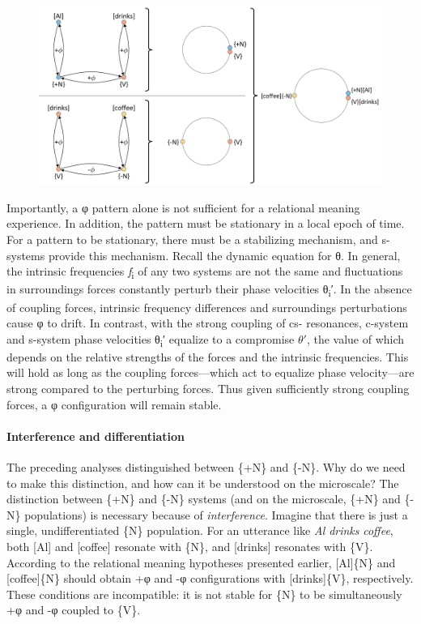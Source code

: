   
\begin{figure}
\includegraphics[width=\textwidth]{figures/Tilsen-img22.png}
\caption{\missingcaption}
\label{fig:}
\end{figure}
 

  Importantly, a φ pattern alone is not sufficient for a relational meaning experience. In addition, the pattern must be stationary in a local epoch of time. For a pattern to be stationary, there must be a stabilizing mechanism, and s-systems provide this mechanism. Recall the dynamic equation for θ. In general, the intrinsic frequencies \textit{f}\textsubscript{i} of any two systems are not the same and fluctuations in surroundings forces constantly perturb their phase velocities θ\textsubscript{i}′. In the absence of coupling forces, intrinsic frequency differences and surroundings perturbations cause φ to drift. In contrast, with the strong coupling of cs- resonances, c-system and s-system phase velocities θ\textsubscript{i}′ equalize to a compromise $\theta ′$, the value of which depends on the relative strengths of the forces and the intrinsic frequencies. This will hold as long as the coupling forces—which act to equalize phase velocity—are strong compared to the perturbing forces. Thus given sufficiently strong coupling forces, a φ configuration will remain stable.

\paragraph{Interference and differentiation}

The preceding analyses distinguished between \{+N\} and \{-N\}. Why do we need to make this distinction, and how can it be understood on the microscale? The distinction between \{+N\} and \{-N\} systems (and on the microscale, \{+N\} and \{-N\} populations) is necessary because of \textit{interference}. Imagine that there is just a single, undifferentiated \{N\} population. For an utterance like \textit{Al} \textit{drinks} \textit{coffee}, both [Al] and [coffee] resonate with \{N\}, and [drinks] resonates with \{V\}. According to the relational meaning hypotheses presented earlier, [Al]\{N\} and [coffee]\{N\} should obtain +φ and -φ configurations with [drinks]\{V\}, respectively. These conditions are incompatible: it is not stable for \{N\} to be simultaneously +φ and -φ coupled to \{V\}.

